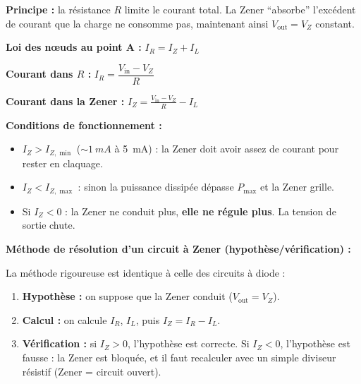 \documentclass[12pt,a4paper,twoside]{book}
\begin{document}
\begin{formule}
\textbf{Principe :} la résistance $R$ limite le courant total. La Zener ``absorbe'' l'excédent de courant que la charge ne consomme pas, maintenant ainsi $V_{\text{out}} = V_Z$ constant.

\textbf{Loi des n\oe uds au point A :} $I_R = I_Z + I_L$

\textbf{Courant dans $R$ :} $I_R = \dfrac{V_{\text{in}} - V_Z}{R}$

\textbf{Courant dans la Zener :} $\boxed{I_Z = \frac{V_{\text{in}} - V_Z}{R} - I_L}$

\textbf{Conditions de fonctionnement :}
\begin{itemize}[nosep]
\item $I_Z > I_{Z,\min}$ ($\sim\SI{1}{mA}$ à \SI{5}{mA}) : la Zener doit avoir assez de courant pour rester en claquage.
\item $I_Z < I_{Z,\max}$ : sinon la puissance dissipée dépasse $P_{\max}$ et la Zener grille.
\item Si $I_Z < 0$ : la Zener ne conduit plus, \textbf{elle ne régule plus}. La tension de sortie chute.
\end{itemize}
\end{formule}

\begin{pratique}
\textbf{Méthode de résolution d'un circuit à Zener (hypothèse/vérification) :}

La méthode rigoureuse est identique à celle des circuits à diode :
\begin{enumerate}[nosep]
\item \textbf{Hypothèse :} on suppose que la Zener conduit ($V_{\text{out}} = V_Z$).
\item \textbf{Calcul :} on calcule $I_R$, $I_L$, puis $I_Z = I_R - I_L$.
\item \textbf{Vérification :} si $I_Z > 0$, l'hypothèse est correcte. Si $I_Z < 0$, l'hypothèse est fausse : la Zener est bloquée, et il faut recalculer avec un simple diviseur résistif (Zener = circuit ouvert).
\end{enumerate}
\end{pratique}
\end{document}
